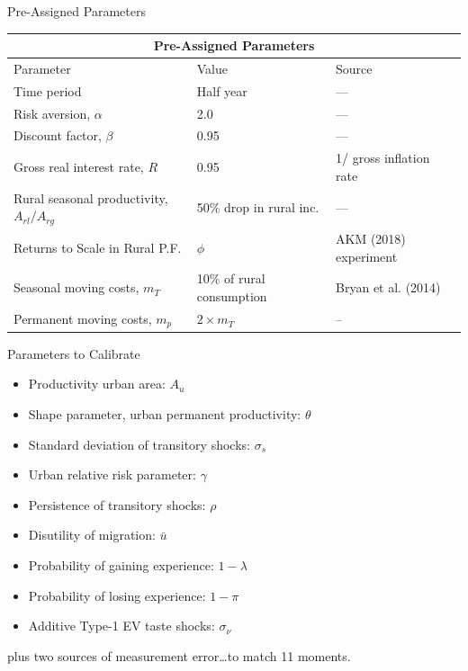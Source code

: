 \documentclass[9pt,pdftex,aspectratio=1610]{beamer}
\theoremstyle{definition}
\begin{document}

\begin{frame}[t]{Pre-Assigned Parameters}
\begin{table}[!t]
\footnotesize
\setlength {\tabcolsep}{1.25mm}
\renewcommand{\arraystretch}{1.75}
\begin{center}
\begin{tabular}{l l l }
\multicolumn{3}{c}{\textbf{\small Pre-Assigned Parameters}}\\
\hline
\hline
Parameter & Value & Source \\
\hline
Time period & Half year  & --- \\
Risk aversion, $\alpha$  & 2.0 & --- \\
Discount factor, $\beta$ & 0.95 & ---  \\
Gross real interest rate, $R$ & 0.95 & 1/ gross inflation rate \\
Rural seasonal productivity, $A_{rl}/A_{rg}$ & 50\% drop in rural inc. & --- \\
Returns to Scale in Rural P.F. & $\phi$ & AKM (2018) experiment\\
Seasonal moving costs, $m_T$ &  10\% of rural consumption & Bryan et al. (2014) \\
Permanent moving costs, $m_p$  &  $2 \times m_T$ & -- \\
\hline
\end{tabular}
\end{center}
\end{table}
\end{frame}


\begin{frame}[t]{Parameters to Calibrate}
\begin{itemize}
\item Productivity urban area: $A_u$
\smallskip
\item Shape parameter, urban permanent productivity: $\theta$
\smallskip
\item Standard deviation of transitory shocks: $\sigma_s$
\smallskip
\item Urban relative risk parameter: $\gamma$
\smallskip
\item Persistence of transitory shocks: $\rho$
\smallskip
\item Disutility of migration: $\bar u$
\smallskip
\item Probability of gaining experience: $1-\lambda$
\smallskip
\item Probability of losing experience: $1-\pi$
\smallskip
\item Additive Type-1 EV taste shocks: $\sigma_{\nu}$
\end{itemize}
\medskip
plus two sources of measurement error\ldots to match 11 moments.
\end{frame}
\end{document}
